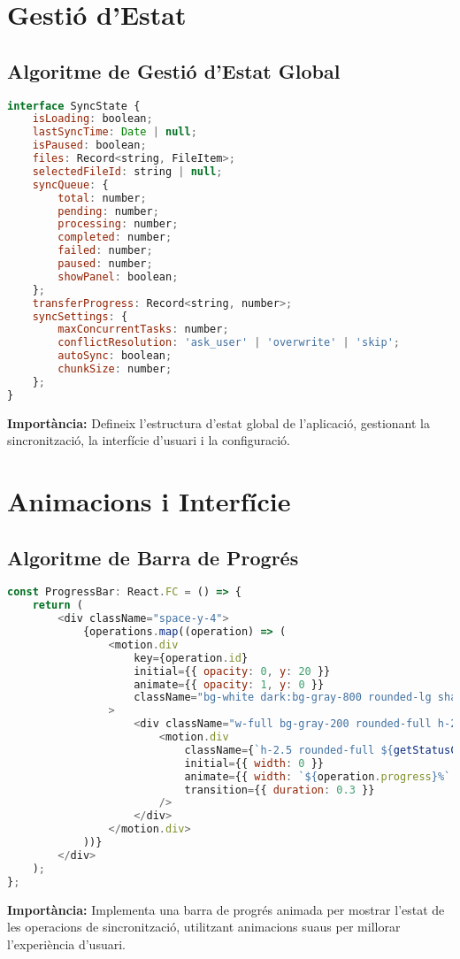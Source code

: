 \section{Gestió d'Estat}

\subsection{Algoritme de Gestió d'Estat Global}
\begin{lstlisting}[language=JavaScript]
interface SyncState {
    isLoading: boolean;
    lastSyncTime: Date | null;
    isPaused: boolean;
    files: Record<string, FileItem>;
    selectedFileId: string | null;
    syncQueue: {
        total: number;
        pending: number;
        processing: number;
        completed: number;
        failed: number;
        paused: number;
        showPanel: boolean;
    };
    transferProgress: Record<string, number>;
    syncSettings: {
        maxConcurrentTasks: number;
        conflictResolution: 'ask_user' | 'overwrite' | 'skip';
        autoSync: boolean;
        chunkSize: number;
    };
}
\end{lstlisting}
\textbf{Importància:} Defineix l'estructura d'estat global de l'aplicació, gestionant la sincronització, la interfície d'usuari i la configuració.

\section{Animacions i Interfície}

\subsection{Algoritme de Barra de Progrés}
\begin{lstlisting}[language=JavaScript]
const ProgressBar: React.FC = () => {
    return (
        <div className="space-y-4">
            {operations.map((operation) => (
                <motion.div
                    key={operation.id}
                    initial={{ opacity: 0, y: 20 }}
                    animate={{ opacity: 1, y: 0 }}
                    className="bg-white dark:bg-gray-800 rounded-lg shadow p-4"
                >
                    <div className="w-full bg-gray-200 rounded-full h-2.5 dark:bg-gray-700">
                        <motion.div
                            className={`h-2.5 rounded-full ${getStatusColor(operation.status)}`}
                            initial={{ width: 0 }}
                            animate={{ width: `${operation.progress}%` }}
                            transition={{ duration: 0.3 }}
                        />
                    </div>
                </motion.div>
            ))}
        </div>
    );
};
\end{lstlisting}
\textbf{Importància:} Implementa una barra de progrés animada per mostrar l'estat de les operacions de sincronització, utilitzant animacions suaus per millorar l'experiència d'usuari. 